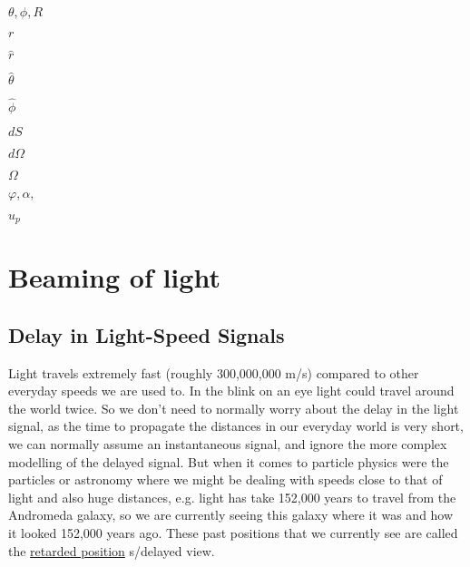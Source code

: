 $\theta, \phi, R$ \newline

$r$ \newline

$\hat{r}$ \newline

$\hat{\theta}$ \newline

$\hat{\phi}$ \newline

$dS$ \newline

$d\Omega$ \newline

$\Omega$ \newline

$\varphi, \alpha,$  \newline

$u_p$ \newline


\chapter{Beaming of light}

\section{Delay in Light-Speed Signals}

Light travels extremely fast (roughly 300,000,000 m/s) compared to other everyday speeds we are used to. In the blink on an eye light could travel around the world twice. So we don't need to normally worry about the delay in the light signal, as the time to propagate the distances in our everyday world is very short, we can normally assume an instantaneous signal, and ignore the more complex modelling of the delayed signal. But when it comes to particle physics were the particles or astronomy where we might be dealing with speeds close to that of light and also huge distances, e.g. light has take 152,000 years to travel from the Andromeda galaxy, so we are currently seeing this galaxy where it was and how it looked 152,000 years ago. These past positions that we currently see are called the \hyperlink{def-retarded-position}{retarded position} s/delayed view. 

